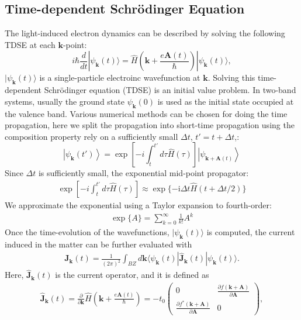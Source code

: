 \subsection{Time-dependent Schr\"odinger Equation}
The light-induced electron dynamics can be described by solving the following \gls {TDSE} at each $\mathbf k$-point:
\begin{equation}
	i\hbar \frac{d}{dt}| \psi_{\mathbf {k}}(t) \rangle = \hat{H}\left ( \mathbf k + \frac{e\mathbf A(t)}{\hbar} \right )| \psi_{\mathbf k}(t) \rangle,
	\label{eqn:TDSE}
\end{equation}
$|\psi_{\mathbf k}(t)\rangle$ is a single-particle electroinc wavefunction at $\mathbf k$.
Solving this time-dependent Schr\"odinger equation (\gls {TDSE}) is an initial value problem. In
two-band systems, usually the ground state $\psi_{\mathbf k}(0)$ is used as the initial state
occupied at the valence band.
Various numerical methods can be chosen for doing the time propagation, here we split the propagation into short-time propagation using the composition property rely on a sufficiently small $\Delta t$, $t'=t+\Delta t$,:
\begin{equation}
	\left|\psi_{\mathbf{k}}(t')\right\rangle=\exp \left[-i \int_{t}^{t'} d \tau \hat{H}(\tau) \right]\left|\psi_{\mathbf{k}+\mathbf{A}(t)}\right\rangle
	\label{eqn:deltat}
\end{equation}
Since $\Delta t$ is sufficiently small, the exponential mid-point propagator:
\begin{align}
	\exp \left[-i \int_{t}^{t'} d \tau \hat{H}(\tau) \right] \approx  \exp \{-\mathrm{i} \Delta t \hat{H}(t+\Delta t / 2)\}
\end{align}
We approximate the exponential using a Taylor expansion to fourth-order:
\begin{align}
	\exp \{A\}=\sum_{k=0}^{\infty} \frac{1}{k!} A^k
\end{align}
Once the time-evolution of the wavefunctions, $|\psi_{\mathbf k}(t)\rangle$ is computed, the current induced in the matter can be further evaluated with
\begin{align}
	\mathbf{J}_{\mathbf k}(t)=\frac{1}{(2\pi)^2} \int_{BZ} d\mathbf k\langle \psi_{\mathbf k}(t)|\hat{\mathbf J}_{\mathbf k}(t)| \psi_{\mathbf{k}}(t)\rangle.
	\label{eq:current}
\end{align}
Here, $\hat {\mathbf J}_{\mathbf k}(t)$ is the current operator, and it is defined as
\begin{align}
	\hat {\mathbf J}_{\mathbf k}(t) = \frac{\partial }{\partial \mathbf k}\hat H \left (\mathbf k + \frac{e\mathbf A(t)}{\hbar} \right ) =
	-t_0 \left(\begin{array}{cc}
			           0                                                              & \frac{\partial f(\mathbf{k}+\mathbf{A})}{\partial \mathbf A} \\
			           \frac{\partial f^*(\mathbf{k}+\mathbf{A})}{\partial \mathbf A} & 0
		           \end{array}\right),
\end{align}

